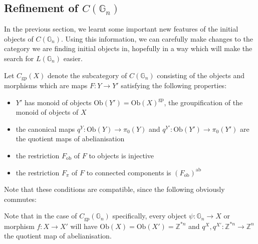 \documentclass{amsart} %
\newenvironment{eq*}{\begin{equation*}}{\end{equation*}}
\begin{document}
\subsection{Refinement of $C(\mathbb{G}_n)$}

In the previous section, we learnt some important new features of the initial objects of $C(\mathbb{G}_n)$. Using this information, we can carefully make changes to the category we are finding initial objects in, hopefully in a way which will make the search for $L(\mathbb{G}_n)$ easier.

\begin{defi} Let $C_{\mathrm{gp}}(X)$ denote the subcategory of $C(\mathbb{G}_n)$ consisting of the objects and morphisms which are maps $F: Y \to Y'$ satisfying the following properties:
\begin{itemize}
\item $Y'$ has monoid of objects $\mathrm{Ob}(Y') = \mathrm{Ob}(X)^{\mathrm{gp}}$, the groupification of the monoid of objects of $X$
\item the canonical maps $q^Y: \mathrm{Ob}(Y) \to \pi_0(Y)$ and $q^{Y'}: \mathrm{Ob}(Y') \to \pi_0(Y')$ are the quotient maps of abelianisation
\item the restriction $F_{\mathrm{ob}}$ of $F$ to objects is injective
\item the restriction $F_\pi$ of $F$ to connected components is $(F_{\mathrm{ob}})^{\mathrm{ab}}$
\end{itemize}
\end{defi}

Note that these conditions are compatible, since the following obviously commutes:
\begin{eq*}  \end{eq*}
Note that in the case of $C_{\mathrm{gp}}(\mathbb{G}_n)$ specifically, every object $\psi: \mathbb{G}_n \to X$ or morphism $f: X \to X'$ will have $\mathrm{Ob}(X) = \mathrm{Ob}(X') = \mathbb{Z}^{\ast n}$ and $q^X, q^{X'}: \mathbb{Z}^{\ast n} \to \mathbb{Z}^n$ the quotient map of abelianisation.
\end{document}
